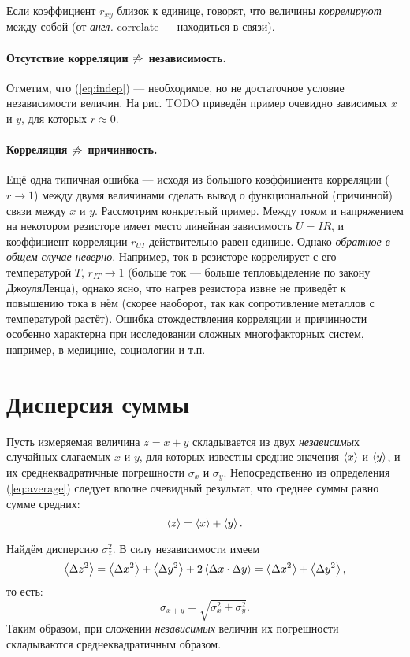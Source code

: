 Если коэффициент $r_{xy}$ близок к единице, говорят, что величины
\emph{коррелируют} между собой (от \emph{англ.} correlate ---
находиться в связи).

\paragraph{Отсутствие корреляции $\protect\not\Rightarrow$ независимость.}

Отметим, что (\ref{eq:indep}) --- необходимое,
но не достаточное условие независимости величин. На рис. TODO приведён
пример очевидно зависимых $x$ и $y$, для которых $r\approx0$.

\paragraph{Корреляция $\protect\not\Rightarrow$ причинность.}

Ещё одна типичная ошибка --- исходя из большого
коэффициента корреляции ($r\to1$) между двумя величинами сделать
вывод о функциональной (причинной) связи между $x$ и $y$. Рассмотрим
конкретный пример. Между током и напряжением на некотором резисторе
имеет место линейная зависимость $U=IR$, и коэффициент корреляции
$r_{UI}$ действительно равен единице. Однако \emph{обратное
в общем случае неверно}. Например, ток в резисторе коррелирует
с его температурой $T$, $r_{IT}\to1$ (больше ток --- больше
тепловыделение по закону Джоуля\textendash Ленца), однако ясно, что
нагрев резистора извне не приведёт к повышению тока в нём (скорее
наоборот, так как сопротивление металлов с температурой растёт). Ошибка
отождествления корреляции и причинности особенно характерна при исследовании
сложных многофакторных систем, например, в медицине, социологии и
т.п.

\section{Дисперсия суммы}\label{sec:sum2}

Пусть измеряемая величина $z=x+y$ складывается из двух \emph{независимы}х
случайных слагаемых $x$ и $y$, для которых известны средние значения
$\left<x\right>$ и $\left<y\right>$, и их среднеквадратичные погрешности
$\sigma_{x}$ и $\sigma_{y}$. Непосредственно из определения (\ref{eq:average})
следует вполне очевидный результат, что среднее суммы равно сумме
средних:
\[
    \left<z\right>=\left<x\right>+\left<y\right>.
\]

Найдём дисперсию $\sigma_{z}^{2}$. В силу независимости имеем
\[
    \left<\Delta z^{2}\right>=\left<\Delta x^{2}\right>+\left<\Delta
    y^{2}\right>+2\left<\Delta x\cdot\Delta y\right>=\left<\Delta x^{2}\right>+\left<\Delta
    y^{2}\right>,
\]
то есть:
\begin{equation}
    \label{eq:sigma_sum}
    \boxed{{\sigma_{x+y}=\sqrt{\sigma_{x}^{2}+\sigma_{y}^{2}}}}.
\end{equation}
Таким образом, при сложении \emph{независимых }величин их погрешности
складываются среднеквадратичным образом.

